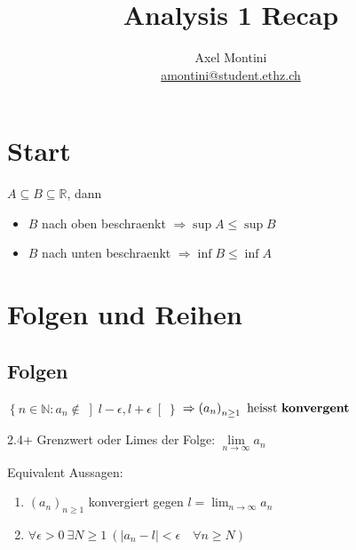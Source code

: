 \documentclass[8pt,a4paper,twocolumn,table]{extarticle}
\title{Analysis 1 Recap}
\author{Axel Montini \\ \href{mailto:amontini@student.ethz.ch}{amontini@student.ethz.ch}}
\newcommand{\N}{\mathbb{N}}
\newcommand{\R}{\mathbb{R}}
\newcommand{\seq}[1]{\left( #1_n \right)_{n \ge 1}}
\begin{document}
\maketitle

\section{Start}

\begin{korollar}{1.16}
    \label{korollar:inf-sup}
    $A \subseteq B \subseteq \R$, dann
    \begin{itemize}
        \item $B$ nach oben beschraenkt $\Rightarrow \sup A \le \sup B$
        \item $B$ nach unten beschraenkt $\Rightarrow \inf B \le \inf A$
    \end{itemize}
\end{korollar}

\section{Folgen und Reihen}
\subsection{Folgen}
\begin{definition}{2.4}
    $\left\{ n \in \N : a_n \notin \left] l - \epsilon, l + \epsilon \right[ \right\}$
    $\Rightarrow \seq{a}\ \mbox{heisst \textbf{konvergent}}$
\end{definition}

\begin{definition}{2.4+}
    Grenzwert oder Limes der Folge: $\underset{n \to \infty}{\lim} a_n$
\end{definition}

\begin{lemma}
    Equivalent Aussagen:
    \begin{enumerate}
        \item $\seq{a}$ konvergiert gegen $l = \lim_{n \to \infty} a_n$
        \item $\forall \epsilon > 0\ \exists N \ge 1\ \left( \lvert a_n - l \rvert < \epsilon \quad \forall n \ge N \right)$
    \end{enumerate}
\end{lemma}
\end{document}
